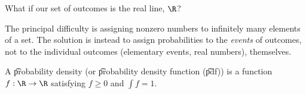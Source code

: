 

What if our set of outcomes is the real line, $\R $?


The principal difficulty is assigning nonzero numbers to infinitely many elements of a set.
The solution is instead to assign probabilities to the \textit{events} of outcomes, not to the individual outcomes (elementary events, real numbers), themselves.

A \t{probability density} (or \t{probability density function} (\t{pdf})) is a function $f: \R  \to \R $ satisfying $f \geq 0$ and $\int f = 1$.

\blankpage
